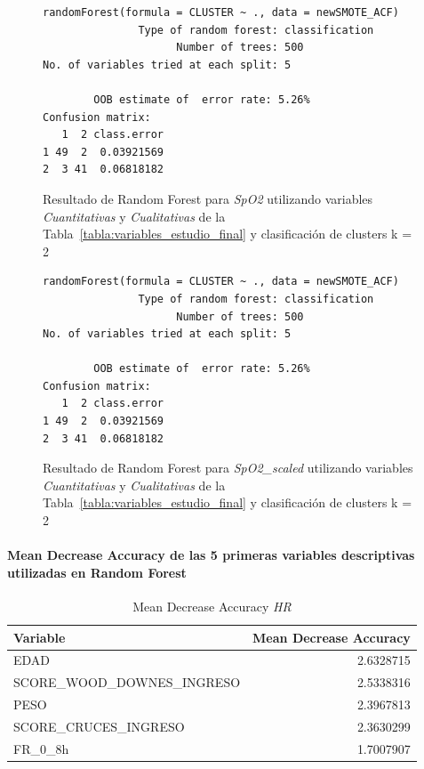 \begin{figure}[H]
    \centering
    \begin{lstlisting}[frame=single, basicstyle=\small\ttfamily]
        randomForest(formula = CLUSTER ~ ., data = newSMOTE_ACF) 
               Type of random forest: classification
                     Number of trees: 500
No. of variables tried at each split: 5

        OOB estimate of  error rate: 5.26%
Confusion matrix:
   1  2 class.error
1 49  2  0.03921569
2  3 41  0.06818182
    \end{lstlisting}
    \caption{Resultado de Random Forest para \textit{SpO2} utilizando variables \textit{Cuantitativas} y \textit{Cualitativas} de la Tabla~\ref{tabla:variables_estudio_final} y clasificación de clusters k = 2}\label{fig:random_forest_acf_result_4}
\end{figure}
\begin{figure}[H]
    \centering
    \begin{lstlisting}[frame=single, basicstyle=\small\ttfamily]
        randomForest(formula = CLUSTER ~ ., data = newSMOTE_ACF) 
               Type of random forest: classification
                     Number of trees: 500
No. of variables tried at each split: 5

        OOB estimate of  error rate: 5.26%
Confusion matrix:
   1  2 class.error
1 49  2  0.03921569
2  3 41  0.06818182
    \end{lstlisting}
    \caption{Resultado de Random Forest para \textit{SpO2\_scaled} utilizando variables \textit{Cuantitativas} y \textit{Cualitativas} de la Tabla~\ref{tabla:variables_estudio_final} y clasificación de clusters k = 2}
    \label{fig:random_forest_acf_result_5}
\end{figure}

\paragraph{Mean Decrease Accuracy de las 5 primeras variables descriptivas utilizadas en Random Forest}

\begin{table}[H]
    \centering
    \begin{tabular}{lr}
        \toprule
        \textbf{Variable} & \textbf{Mean Decrease Accuracy} \\
        \midrule
        EDAD & 2.6328715 \\
        SCORE\_WOOD\_DOWNES\_INGRESO & 2.5338316 \\
        PESO & 2.3967813 \\
        SCORE\_CRUCES\_INGRESO & 2.3630299 \\
        FR\_0\_8h & 1.7007907 \\
        \bottomrule
    \end{tabular}
    \caption{Mean Decrease Accuracy \textit{HR}}
\end{table}

